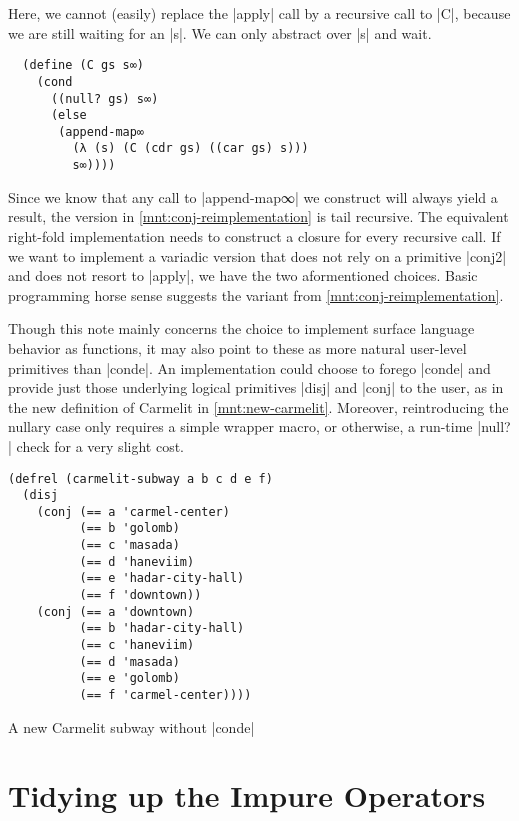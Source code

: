 \documentclass[sigplan,draft,natbib=false]{acmart}
\begin{document}
\noindent Here, we cannot (easily) replace the \rackinline|apply| call
by a recursive call to \rackinline|C|, because we are still waiting
for an \rackinline|s|. We can only abstract over \rackinline|s| and
wait.

\begin{verbatim}
  (define (C gs s∞)
    (cond
      ((null? gs) s∞)
      (else
       (append-map∞
         (λ (s) (C (cdr gs) ((car gs) s)))
         s∞))))
\end{verbatim}

Since we know that any call to \rackinline|append-map∞| we construct
will always yield a result, the version in
\cref{mnt:conj-reimplementation} is tail recursive. The equivalent
right-fold implementation needs to construct a closure for every
recursive call. If we want to implement a variadic version that does
not rely on a primitive \rackinline|conj2| and does not resort to
\rackinline|apply|, we have the two aformentioned choices. Basic
programming horse sense suggests the variant from
\cref{mnt:conj-reimplementation}.

Though this note mainly concerns the choice to implement surface
language behavior as functions, it may also point to these as more
natural user-level primitives than \rackinline|conde|. An
implementation could choose to forego \rackinline|conde| and provide
just those underlying logical primitives \rackinline|disj| and
\rackinline|conj| to the user, as in the new definition of Carmelit in
\cref{mnt:new-carmelit}. Moreover, reintroducing the nullary case only
requires a simple wrapper macro, or otherwise, a run-time
\rackinline|null?| check for a very slight cost.

\begin{listing}
  \begin{verbatim}
(defrel (carmelit-subway a b c d e f)
  (disj
    (conj (== a 'carmel-center)
          (== b 'golomb)
          (== c 'masada)
          (== d 'haneviim)
          (== e 'hadar-city-hall)
          (== f 'downtown))
    (conj (== a 'downtown)
          (== b 'hadar-city-hall)
          (== c 'haneviim)
          (== d 'masada)
          (== e 'golomb)
          (== f 'carmel-center))))
  \end{verbatim}
  \caption{A new Carmelit subway without \rackinline|conde|}
  \label{mnt:new-carmelit}
\end{listing}

\section{Tidying up the Impure Operators}\label{sec:impure}
\end{document}
